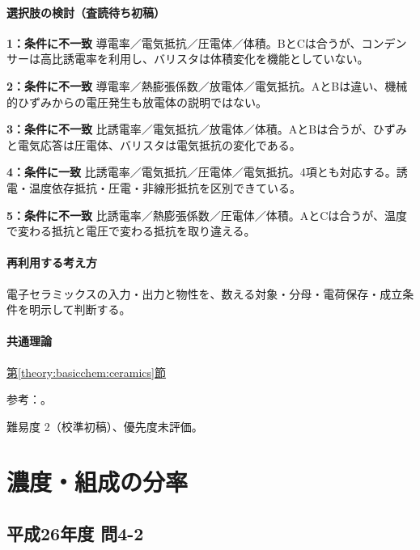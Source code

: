 \paragraph{選択肢の検討（査読待ち初稿）}\mbox{}\par

\noindent\textbf{1：条件に不一致} 導電率／電気抵抗／圧電体／体積。BとCは合うが、コンデンサーは高比誘電率を利用し、バリスタは体積変化を機能としていない。\par

\noindent\textbf{2：条件に不一致} 導電率／熱膨張係数／放電体／電気抵抗。AとBは違い、機械的ひずみからの電圧発生も放電体の説明ではない。\par

\noindent\textbf{3：条件に不一致} 比誘電率／電気抵抗／放電体／体積。AとBは合うが、ひずみと電気応答は圧電体、バリスタは電気抵抗の変化である。\par

\noindent\textbf{4：条件に一致} 比誘電率／電気抵抗／圧電体／電気抵抗。4項とも対応する。誘電・温度依存抵抗・圧電・非線形抵抗を区別できている。\par

\noindent\textbf{5：条件に不一致} 比誘電率／熱膨張係数／圧電体／体積。AとCは合うが、温度で変わる抵抗と電圧で変わる抵抗を取り違える。\par

\paragraph{再利用する考え方} 電子セラミックスの入力・出力と物性を、数える対象・分母・電荷保存・成立条件を明示して判断する。

\paragraph{共通理論} \hyperref[theory:basicchem:ceramics]{第\ref*{theory:basicchem:ceramics}節}

\par 参考：\cite{murata_batio3,murata_thermistor,murata_piezo,tdk_varistor}。

\par 難易度 2（校準初稿）、優先度未評価。

\section{濃度・組成の分率}

\subsection{平成26年度 問4-2}
\label{q:h26-reg-basic-4-2}

